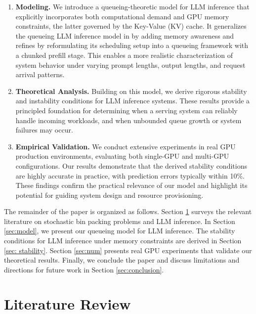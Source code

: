 \documentclass{article}
\theoremstyle{plain}
\theoremstyle{definition}
\theoremstyle{remark}
\begin{document}
\begin{enumerate}


    \item \textbf{Modeling.} We introduce a queueing-theoretic model for LLM inference that explicitly incorporates both computational demand and GPU memory constraints, the latter governed by the Key-Value (KV) cache. It generalizes the queueing LLM inference model in \cite{li2025throughput} by adding memory awareness and refines \cite{jaillet2025online} by reformulating its scheduling setup into a queueing framework with a chunked prefill stage. This enables a more realistic characterization of system behavior under varying prompt lengths, output lengths, and request arrival patterns.

\item \textbf{Theoretical Analysis.} Building on this model, we derive rigorous stability and instability conditions for LLM inference systems. These results provide a principled foundation for determining when a serving system can reliably handle incoming workloads, and when unbounded queue growth or system failures may occur.

\item \textbf{Empirical Validation.} We conduct extensive experiments in real GPU production environments, evaluating both single-GPU and multi-GPU configurations. Our results demonstrate that the derived stability conditions are highly accurate in practice, with prediction errors typically within 10\%. These findings confirm the practical relevance of our model and highlight its potential for guiding system design and resource provisioning.
\end{enumerate}

The remainder of the paper is organized as follows. Section \ref{sec:liter} surveys the relevant literature on stochastic bin packing problems and LLM inference. In Section \ref{sec:model}, we present our queueing model for LLM inference. The stability conditions for LLM inference under memory constraints are derived in Section \ref{sec: stability}. Section \ref{sec:num} presents real GPU experiments that validate our theoretical results. Finally, we conclude the paper and discuss limitations and directions for future work in Section \ref{sec:conclusion}.

\section{Literature Review}
\label{sec:liter}
\end{document}
